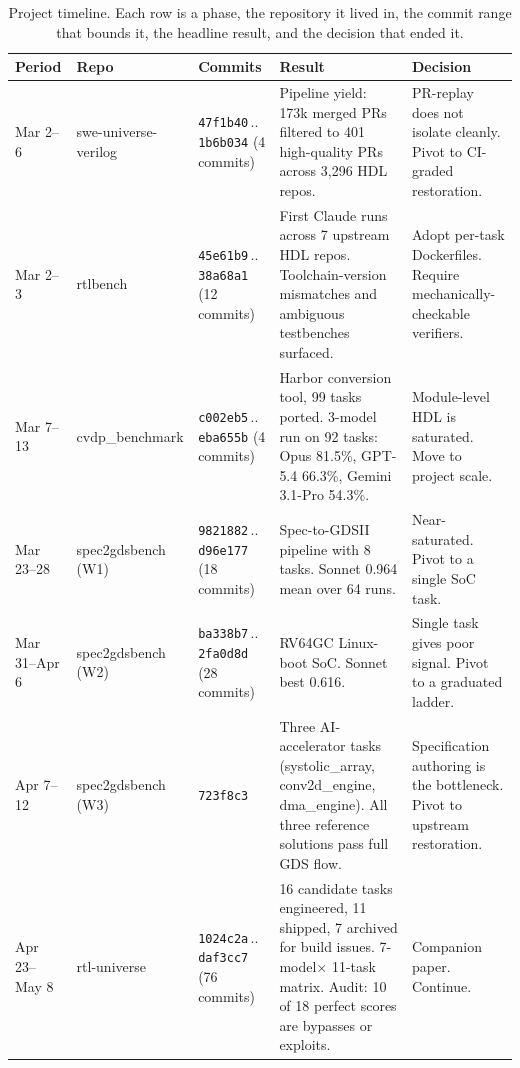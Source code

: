 \documentclass{article}
\begin{document}
\begin{table}[H]
\centering
\caption{Project timeline. Each row is a phase, the repository it lived in, the commit
range that bounds it, the headline result, and the decision that ended it.}
\label{tab:timeline}
\scriptsize
\setlength{\tabcolsep}{3pt}
\begin{tabular}{@{}l l l p{3.0cm} p{3.4cm}@{}}
\toprule
Period & Repo & Commits & Result & Decision \\
\midrule
Mar 2--6     & swe-universe-verilog  & \texttt{47f1b40}\,..\,\texttt{1b6b034} (4 commits) &
  Pipeline yield: 173k merged PRs filtered to 401 high-quality PRs across 3{,}296 HDL
  repos. &
  PR-replay does not isolate cleanly. Pivot to CI-graded restoration. \\
Mar 2--3     & rtlbench              & \texttt{45e61b9}\,..\,\texttt{38a68a1} (12 commits) &
  First Claude runs across 7 upstream HDL repos. Toolchain-version mismatches and ambiguous
  testbenches surfaced. &
  Adopt per-task Dockerfiles. Require mechanically-checkable verifiers. \\
Mar 7--13    & cvdp\_benchmark       & \texttt{c002eb5}\,..\,\texttt{eba655b} (4 commits) &
  Harbor conversion tool, 99 tasks ported. 3-model run on 92 tasks: Opus 81.5\%,
  GPT-5.4 66.3\%, Gemini 3.1-Pro 54.3\%. &
  Module-level HDL is saturated. Move to project scale. \\
Mar 23--28   & spec2gdsbench (W1)    & \texttt{9821882}\,..\,\texttt{d96e177} (18 commits) &
  Spec-to-GDSII pipeline with 8 tasks. Sonnet 0.964 mean over 64 runs. &
  Near-saturated. Pivot to a single SoC task. \\
Mar 31--Apr 6 & spec2gdsbench (W2)   & \texttt{ba338b7}\,..\,\texttt{2fa0d8d} (28 commits) &
  RV64GC Linux-boot SoC. Sonnet best 0.616. &
  Single task gives poor signal. Pivot to a graduated ladder. \\
Apr 7--12    & spec2gdsbench (W3)    & \texttt{723f8c3}                                    &
  Three AI-accelerator tasks (systolic\_array, conv2d\_engine, dma\_engine). All three
  reference solutions pass full GDS flow. &
  Specification authoring is the bottleneck. Pivot to upstream restoration. \\
Apr 23--May 8 & rtl-universe         & \texttt{1024c2a}\,..\,\texttt{daf3cc7} (76 commits) &
  16 candidate tasks engineered, 11 shipped, 7 archived for build issues. 7-model$\times$
  11-task matrix. Audit: 10 of 18 perfect scores are bypasses or exploits. &
  Companion paper. Continue. \\
\bottomrule
\end{tabular}
\end{table}
\end{document}
